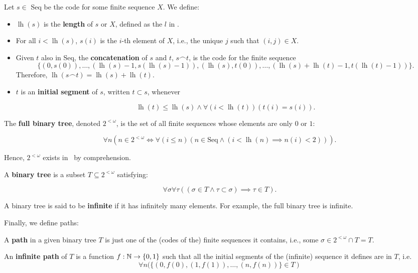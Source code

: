 \documentclass[../main.tex]{memoir}
\begin{document}
\begin{definition}
  Let $s \in$ Seq be the code for some finite sequence $X$. We define:

  \begin{itemize}
  \item $\operatorname{lh}(s)$ is the \textbf{length} of $s$ or $X$, defined as the $l$ in .
  \item For all $i < \operatorname{lh}(s)$, $s(i)$ is the $i$-th element of $X$, i.e., the unique $j$ such that $(i, j) \in X$.
  \item Given $t$ also in Seq, the \textbf{concatenation} of $s$ and $t$, $s \frown t$, is the code for the finite sequence
    \[ \{(0, s(0)), \ldots, (\operatorname{lh}(s) - 1, s(\operatorname{lh}(s) - 1)),
      (\operatorname{lh}(s), t(0)), \ldots, (\operatorname{lh}(s) + \operatorname{lh}(t) - 1, t(\operatorname{lh}(t) - 1))\}. \]
    Therefore, $\operatorname{lh}(s \frown t) = \operatorname{lh}(s) + \operatorname{lh}(t)$.
  \item $t$ is an \textbf{initial segment} of $s$, written $t \subset s$, whenever

    \[ \operatorname{lh}(t) \le \operatorname{lh}(s) \land \forall (i < \operatorname{lh}(t)) (t(i) = s(i)). \]
  \end{itemize}
\end{definition}

\begin{definition}[Trees]
  The \textbf{full binary tree}, denoted $2^{<\omega}$, is the set of all finite sequences whose elements are only $0$ or $1$:

  \[ \forall n (n \in 2^{<\omega} \iff \forall (i \le n) (n \in \text{Seq} \land (i < \operatorname{lh}(n) \implies n(i) < 2))). \]

  Hence, $2^{<\omega}$ exists in \rca\ by  comprehension.

  A \textbf{binary tree} is a subset $T \subseteq 2^{<\omega}$ satisfying:

  \[ \forall \sigma \forall \tau ((\sigma \in T \land \tau \subset \sigma) \implies \tau \in T). \]

  A binary tree is said to be \textbf{infinite} if it has infinitely many elements. For example, the full binary tree is infinite.
\end{definition}

Finally, we define paths:

\begin{definition}
  A \textbf{path} in a given binary tree $T$ is just one of the (codes of the) finite sequences it contains, i.e., some $\sigma \in 2^{<\omega} \cap T = T$.

  An \textbf{infinite path} of $T$ is a function $f: \mathbb{N} \to \{0, 1\}$ such that all the initial segments of the (infinite) sequence it defines are in $T$, i.e.
  \[ \forall n (\{(0, f(0), (1, f(1)), \ldots, (n, f(n))\} \in T) \]
\end{definition}
\end{document}

